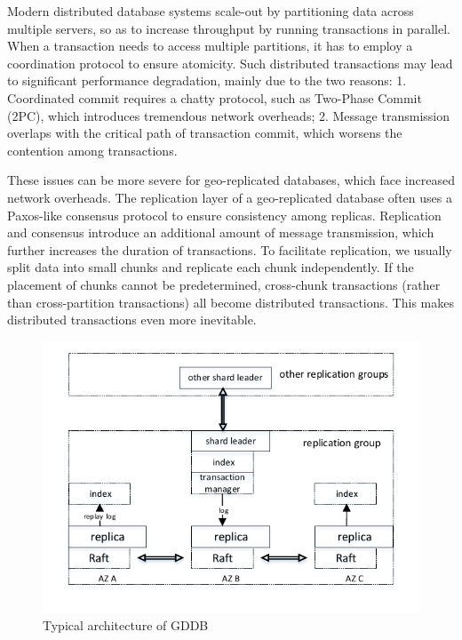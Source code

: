 \documentclass[conference]{IEEEtran}
\begin{document}
Modern distributed database systems scale-out by partitioning data across multiple servers,
so as to increase throughput by running transactions in parallel.
When a transaction needs to access multiple partitions, it has to employ a coordination protocol to ensure atomicity.
Such distributed transactions may lead to significant performance degradation, mainly due to the two reasons\cite{Calvin:conf/sigmod/ThomsonDWRSA12}:
1. Coordinated commit requires a chatty protocol, such as Two-Phase Commit (2PC), which introduces tremendous network overheads;
2. Message transmission overlaps with the critical path of transaction commit, which worsens the contention among transactions.

These issues can be more severe for geo-replicated databases, which face increased network overheads.
The replication layer of a geo-replicated database often uses a Paxos-like consensus protocol to ensure consistency among replicas.
Replication and consensus introduce an additional amount of message transmission, which further increases the duration of transactions.
To facilitate replication, we usually split data into small chunks and replicate each chunk independently.
If the placement of chunks cannot be predetermined, cross-chunk transactions (rather than cross-partition transactions) all become distributed transactions.
This makes distributed transactions even more inevitable.

\begin{figure}[tbp]
  \centerline{\includegraphics[scale=0.7]{figure/architecture.pdf}}
  \caption{Typical architecture of GDDB}
  \label{fig:architecture}
\end{figure}
\end{document}
